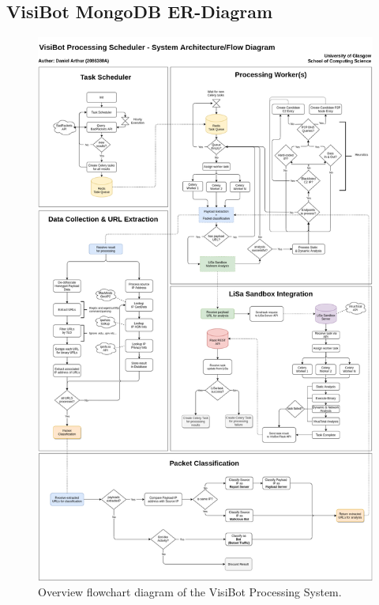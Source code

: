\begin{appendices}
\section{VisiBot MongoDB ER-Diagram}
\label{appendix_a4}
\begin{figure}[!htbp]
 \centering
 \includegraphics[width=0.85\linewidth]{flowcharts/low_level_overview.png}
 \caption{Overview flowchart diagram of the VisiBot Processing System.}
\end{figure}



\end{appendices}
